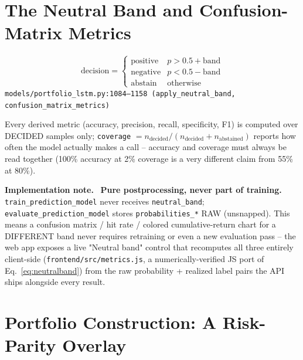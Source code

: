 \documentclass[11pt]{article}
\newcommand{\srcref}[1]{\hfill\textcolor{cmtcolor}{\footnotesize\texttt{#1}}}
\newcommand{\code}[1]{\texttt{\small #1}}
\newcommand{\fixnotelabel}{\small\textbf{Implementation note.}~}
\begin{document}
\section{The Neutral Band and Confusion-Matrix Metrics}
\label{sec:neutralband}

\begin{equation}
  \text{decision} = \begin{cases} \text{positive} & p > 0.5 + \text{band} \\ \text{negative} & p < 0.5 - \text{band} \\ \text{abstain} & \text{otherwise} \end{cases}
  \label{eq:neutralband}
\end{equation}
\srcref{models/portfolio\_lstm.py:1084--1158 (\texttt{apply\_neutral\_band},
\texttt{confusion\_matrix\_metrics})}

Every derived metric (accuracy, precision, recall, specificity, F1) is computed over
DECIDED samples only; \code{coverage} $= n_{\text{decided}} / (n_{\text{decided}} +
n_{\text{abstained}})$ reports how often the model actually makes a call -- accuracy and
coverage must always be read together (100\% accuracy at 2\% coverage is a very different
claim from 55\% at 80\%).

\begin{fixnote}\fixnotelabel
\textbf{Pure postprocessing, never part of training.} \code{train\_prediction\_model} never
receives \code{neutral\_band}; \code{evaluate\_prediction\_model} stores
\code{probabilities\_*} RAW (unsnapped). This means a confusion matrix / hit rate / colored
cumulative-return chart for a DIFFERENT band never requires retraining or even a new
evaluation pass -- the web app exposes a live "Neutral band" control that recomputes all
three entirely client-side (\code{frontend/src/metrics.js}, a numerically-verified JS port
of Eq.~\ref{eq:neutralband}) from the raw probability + realized label pairs the API ships
alongside every result.
\end{fixnote}

\section{Portfolio Construction: A Risk-Parity Overlay}
\label{sec:portfolio}
\end{document}

